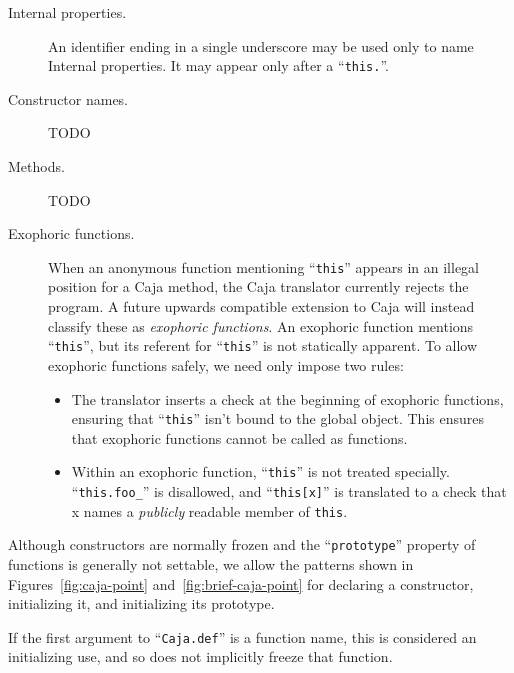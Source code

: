 \documentclass[letterpaper,twocolumn,10pt]{article}
\newcommand{\code}[1]{{\tt {#1}}}              %
\begin{document}
\begin{description}

  \item[Internal properties.] An identifier ending in a single underscore may 
  be used only to name Internal properties. It may appear only after a 
  ``\code{this.}''.
  
  \item[Constructor names.] TODO
  
  \item[Methods.] TODO

  \item[Exophoric functions.] When an anonymous function mentioning 
  ``\code{this}'' appears in an illegal position for a Caja method, the Caja 
  translator currently rejects the program. A future upwards compatible 
  extension to Caja will instead classify these as \emph{exophoric functions}. 
  An exophoric function mentions ``\code{this}'', but its referent for 
  ``\code{this}'' is not statically apparent. To allow exophoric functions 
  safely, we need only impose two rules:
  
  \begin{itemize}

    \item The translator inserts a check at the beginning of exophoric 
    functions, ensuring that ``\code{this}'' isn't bound to the global 
    object. This ensures that exophoric functions cannot be called as 
    functions.
    
    \item Within an exophoric function, ``\code{this}'' is not treated 
    specially. ``\code{this.foo\_}'' is disallowed, and ``\code{this[x]}'' is 
    translated to a check that x names a \emph{publicly} readable member of 
    \code{this}.

  \end{itemize}
  
\end{description}

Although constructors are normally frozen and the ``\code{prototype}'' 
property of functions is generally not settable, we allow the 
patterns shown in Figures~\ref{fig:caja-point} and~\ref{fig:brief-caja-point} 
for declaring a constructor, initializing it, and initializing its prototype.

If the first argument to ``\code{Caja.def}'' is a function name, this is 
considered an initializing use, and so does not implicitly freeze that 
function. 
\end{document}
